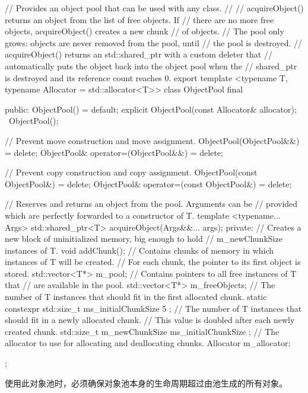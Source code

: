 \begin{cpp}
// Provides an object pool that can be used with any class.
//
// acquireObject() returns an object from the list of free objects. If
// there are no more free objects, acquireObject() creates a new chunk
// of objects.
// The pool only grows: objects are never removed from the pool, until
// the pool is destroyed.
// acquireObject() returns an std::shared_ptr with a custom deleter that
// automatically puts the object back into the object pool when the
// shared_ptr is destroyed and its reference count reaches 0.
export
template <typename T, typename Allocator = std::allocator<T>>
class ObjectPool final
{
    public:
        ObjectPool() = default;
        explicit ObjectPool(const Allocator& allocator);
        ~ObjectPool();

        // Prevent move construction and move assignment.
        ObjectPool(ObjectPool&&) = delete;
        ObjectPool& operator=(ObjectPool&&) = delete;

        // Prevent copy construction and copy assignment.
        ObjectPool(const ObjectPool&) = delete;
        ObjectPool& operator=(const ObjectPool&) = delete;

        // Reserves and returns an object from the pool. Arguments can be
        // provided which are perfectly forwarded to a constructor of T.
        template <typename... Args>
        std::shared_ptr<T> acquireObject(Args&&... args);
    private:
        // Creates a new block of uninitialized memory, big enough to hold
        // m_newChunkSize instances of T.
        void addChunk();
        // Contains chunks of memory in which instances of T will be created.
        // For each chunk, the pointer to its first object is stored.
        std::vector<T*> m_pool;
        // Contains pointers to all free instances of T that
        // are available in the pool.
        std::vector<T*> m_freeObjects;
        // The number of T instances that should fit in the first allocated chunk.
        static constexpr std::size_t ms_initialChunkSize { 5 };
        // The number of T instances that should fit in a newly allocated chunk.
        // This value is doubled after each newly created chunk.
        std::size_t m_newChunkSize { ms_initialChunkSize };
        // The allocator to use for allocating and deallocating chunks.
        Allocator m_allocator;
};
\end{cpp}

使用此对象池时，必须确保对象池本身的生命周期超过由池生成的所有对象。

